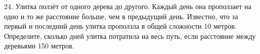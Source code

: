 24. Улитка ползёт от одного дерева до другого. Каждый день она проползает на одно и то же расстояние больше, чем в предыдущий день. Известно, что за первый и последний день улитка проползла в общей сложности 10 метров. Определите, сколько дней улитка потратила на весь путь, если расстояние между деревьями 150 метров.\\
